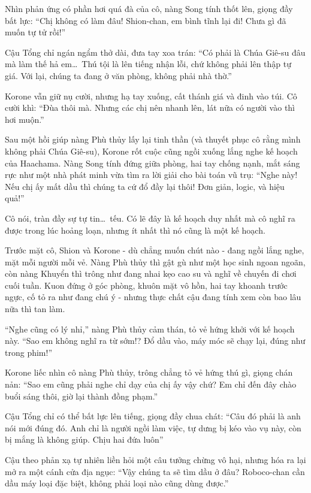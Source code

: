 \documentclass[../main.tex]{subfiles}
\begin{document}

Nhìn phản ứng có phần hơi quá đà của cô, nàng Song tính thốt lên, giọng đầy bất lực: ``Chị không có làm đâu! Shion-chan, em bình tĩnh lại đi! Chưa gì đã muốn tự tử rồi!''

Cậu Tổng chỉ ngán ngẩm thở dài, đưa tay xoa trán: ``Có phải là Chúa Giê-su đâu mà làm thế hả em\dots\ Thú tội là lên tiếng nhận lỗi, chứ không phải lên thập tự giá. Với lại, chúng ta đang ở văn phòng, không phải nhà thờ.''

Korone vẫn giữ nụ cười, nhưng hạ tay xuống, cất thánh giá và đinh vào túi. Cô cười khì: ``Đùa thôi mà. Nhưng các chị nên nhanh lên, lát nữa có người vào thì hơi muộn.''

\ct

Sau một hồi giúp nàng Phù thủy lấy lại tinh thần (và thuyết phục cô rằng mình không phải Chúa Giê-su), Korone rốt cuộc cũng ngồi xuống lắng nghe kế hoạch của Haachama. Nàng Song tính đứng giữa phòng, hai tay chống nạnh, mắt sáng rực như một nhà phát minh vừa tìm ra lời giải cho bài toán vũ trụ: ``Nghe này! Nếu chị ấy mất dầu thì chúng ta cứ đổ đầy lại thôi! Đơn giản, logic, và hiệu quả!''

Cô nói, tràn đầy sự tự tin\dots\ tếu. Có lẽ đây là kế hoạch duy nhất mà cô nghĩ ra được trong lúc hoảng loạn, nhưng ít nhất thì nó cũng là một kế hoạch.

Trước mặt cô, Shion và Korone - dù chẳng muốn chút nào - đang ngồi lắng nghe, mặt mỗi người mỗi vẻ. Nàng Phù thủy thì gật gù như một học sinh ngoan ngoãn, còn nàng Khuyển thì trông như đang nhai kẹo cao su và nghĩ về chuyến đi chơi cuối tuần. Kuon đứng ở góc phòng, khuôn mặt vô hồn, hai tay khoanh trước ngực, cố tỏ ra như đang chú ý - nhưng thực chất cậu đang tính xem còn bao lâu nữa thì tan làm.

``Nghe cũng có lý nhỉ,''  nàng Phù thủy cảm thán, tỏ vẻ hứng khởi với kế hoạch này. ``Sao em không nghĩ ra từ sớm!? Đổ dầu vào, máy móc sẽ chạy lại, đúng như trong phim!''

Korone liếc nhìn cô nàng Phù thủy, trông chẳng tỏ vẻ hứng thú gì, giọng chán nản: ``Sao em cũng phải nghe chỉ dạy của chị ấy vậy chứ? Em chỉ đến đây chào buổi sáng thôi, giờ lại thành đồng phạm.''

Cậu Tổng chỉ có thể bất lực lên tiếng, giọng đầy chua chát: ``Câu đó phải là anh nói mới đúng đó. Anh chỉ là người ngồi làm việc, tự dưng bị kéo vào vụ này, còn bị mắng là không giúp. Chịu hai đứa luôn''

Cậu theo phản xạ tự nhiên liền hỏi một câu tưởng chừng vô hại, nhưng hóa ra lại mở ra một cánh cửa địa ngục: ``Vậy chúng ta sẽ tìm dầu ở đâu? Roboco-chan cần dầu máy loại đặc biệt, không phải loại nào cũng dùng được.''
\end{document}
